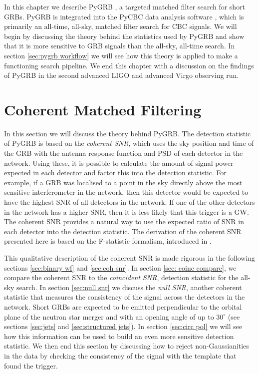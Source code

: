 \documentclass[11pt]{cuthesis}
\begin{document}
In this chapter we describe PyGRB \cite{pygrb_harry, pygrb_Williamson:2014}, a targeted matched filter search for short GRBs. PyGRB is integrated into the PyCBC data analysis software \cite{pycbc_Allen:2005, pycbc_Allen:2004, pycbc_Nitz:2017, pycbc_Canton:2014}, which is primarily an all-time, all-sky, matched filter search for CBC signals. We will begin by discussing the theory behind the statistics used by PyGRB and show that it is more sensitive to GRB signals than the all-sky, all-time search. In section \ref{sec:pygrb workflow} we will see how this theory is applied to make a functioning search pipeline. We end this chapter with a discussion on the findings of PyGRB in the second advanced LIGO and advanced Virgo observing run.


\section{Coherent Matched Filtering} \label{sec:PyGRB}
In this section we will discuss the theory behind PyGRB. The detection statistic of PyGRB is based on the \textit{coherent SNR}, which uses the sky position and time of the GRB with the antenna response function and PSD of each detector in the network. Using these, it is possible to calculate the amount of signal power expected in each detector and factor this into the detection statistic. For example, if a GRB was localised to a point in the sky directly above the most sensitive interferometer in the network, then this detector would be expected to have the highest SNR of all detectors in the network. If one of the other detectors in the network has a higher SNR, then it is less likely that this trigger is a GW. The coherent SNR provides a natural way to use the expected ratio of SNR in each detector into the detection statistic. The derivation of the coherent SNR presented here is based on the F-statistic formalism, introduced in \cite{f-stat1,f-stat2}. 

This qualitative description of the coherent SNR is made rigorous in the following sections \ref{sec:binary wf} and \ref{sec:coh snr}. In section \ref{sec: coinc compare}, we compare the coherent SNR to the \textit{coincident SNR}, detection statistic for the all-sky search. In section \ref{sec:null snr} we discuss the \textit{null SNR}, another coherent statistic that measures the consistency of the signal across the detectors in the network. Short GRBs are expected to be emitted perpendicular to the orbital plane of the neutron star merger and with an opening angle of up to $30^\circ$ (see sections \ref{sec:jets} and \ref{sec:structured jets}). In section \ref{sec:circ pol} we will see how this information can be used to build an even more sensitive detection statistic. We then end this section by discussing how to reject non-Gaussianities in the data by checking the consistency of the signal with the template that found the trigger.
\end{document}
